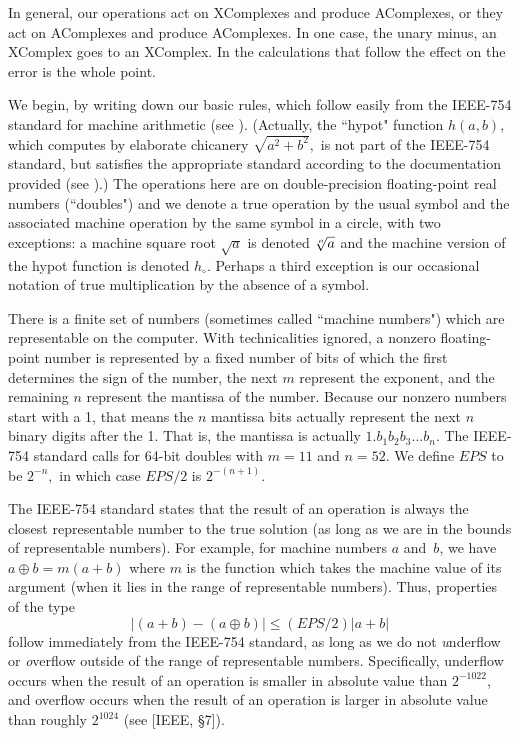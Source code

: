 \begin{remark}\label{GMT 7.3}
In general,  our operations  act on XComplexes and produce AComplexes, or they act on AComplexes and produce
 AComplexes.  In one case, the unary minus, an XComplex goes to an XComplex.  
In the calculations that follow the effect on the error is the whole point.\end{remark}

\begin{conventions} \label{GMT 7.4}
We begin, by writing down our basic rules, which follow easily from the IEEE-754 standard for machine arithmetic (see \cite{IEEE}).
(Actually,  the ``hypot" function $h(a,b)$, which computes by elaborate chicanery $\sqrt{a^2 + b^2},$ is not part of the IEEE-754 standard, but  satisfies the appropriate standard according to the documentation provided (see \cite{K1}).)  The operations here are on
double-precision floating-point real numbers (``doubles") and we denote a true operation by the usual symbol and the associated machine operation by the same symbol in a circle, with two exceptions: a machine square root $\sqrt a$ is denoted $\root o \of a$ and the machine version of the hypot function is denoted $h_\circ$.  Perhaps a third exception is our occasional notation of true multiplication by the absence of a symbol.  

There is a finite set of numbers (sometimes called ``machine numbers") which are representable on the computer.  With
technicalities ignored,    a nonzero floating-point number is represented by a fixed number of bits of which
the first determines the sign of the number, the next $m$ represent the exponent, and the remaining $n$ represent the
mantissa of the number.  Because our nonzero numbers start with a 1, that means the $n$ mantissa bits actually represent
the next
$n$ binary digits after the 1.  That is, the mantissa is actually $1.b_1b_2b_3...b_{n}.$   The IEEE-754 standard calls for
64-bit doubles with $m = 11$ and $n = 52.$  We define $EPS$ to be $2^{-n},$ in which case $EPS/2$ is $2^{-(n + 1)}.$  

The IEEE-754 standard states that the result of an operation
 is always the closest representable number to the true solution (as long as we are in the bounds of representable
numbers).  For example, for machine numbers $a$ and~$b$, we have $a \oplus b = m(a+b)$ where $m$ is the function which
takes the machine value of its argument (when it lies in the range of representable numbers).  Thus, properties of the type
$$|(a + b) - (a \oplus b)| \leq (EPS/2) |a + b|$$
follow immediately from the IEEE-754 standard, as long as we do not {\textit underflow} or {\textit overflow} outside of the range of representable numbers. 
Specifically, underflow occurs when the result of an operation is smaller in absolute value than $2^{-1022}$,
 and overflow occurs when the result of an operation is larger in absolute value than roughly $2^{1024}$
 (see [IEEE, \S 7]).


\end{conventions}
